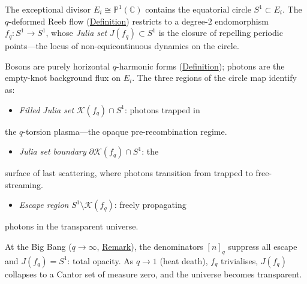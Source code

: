 \begin{remark}
  \label{rem:julia-s1-photon-scatter}
The exceptional divisor $E_i\cong\mathbb{P}^1(\mathbb{C})$ contains the equatorial circle
$S^1\subset E_i$.  The $q$-deformed Reeb flow (\hyperref[def:q-reeb-flow]{Definition})
restricts to a degree-$2$ endomorphism $f_q\colon S^1\to S^1$, whose
\emph{Julia set} $J(f_q)\subset S^1$ is the closure of repelling periodic
points---the locus of non-equicontinuous dynamics on the circle.

Bosons are purely horizontal $q$-harmonic forms (\hyperref[def:boson]{Definition});
photons are the empty-knot background flux on $E_i$.  The three regions of the
circle map identify as:

\begin{itemize}
  \item \emph{Filled Julia set} $\mathcal{K}(f_q)\cap S^1$: photons trapped in
\end{itemize}
  the $q$-torsion plasma---the opaque pre-recombination regime.
\begin{itemize}
  \item \emph{Julia set boundary} $\partial\mathcal{K}(f_q)\cap S^1$: the
\end{itemize}
  surface of last scattering, where photons transition from trapped to
  free-streaming.
\begin{itemize}
  \item \emph{Escape region} $S^1\setminus\mathcal{K}(f_q)$: freely propagating
\end{itemize}
  photons in the transparent universe.

At the Big Bang ($q\to\infty$, \hyperref[rem:reeb-exceptional-divisor]{Remark}), the
denominators $[n]_q$ suppress all escape and $J(f_q)=S^1$: total opacity.
As $q\to 1$ (heat death), $f_q$ trivialises, $J(f_q)$ collapses to a Cantor
set of measure zero, and the universe becomes transparent.
\end{remark}
